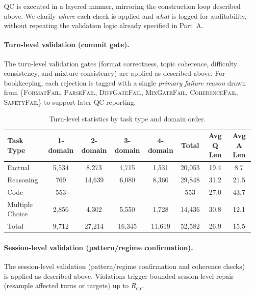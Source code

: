 QC is executed in a layered manner, mirroring the construction loop described above.
We clarify \emph{where} each check is applied and \emph{what} is logged for auditability, without repeating the validation logic already specified in Part~A.

\paragraph{Turn-level validation (commit gate).}
The turn-level validation gates (format correctness, topic coherence, difficulty consistency, and mixture consistency) are applied as described above.
For bookkeeping, each rejection is tagged with a single \emph{primary failure reason} drawn from \{\textsc{FormatFail}, \textsc{ParseFail}, \textsc{DiffGateFail}, \textsc{MixGateFail}, \textsc{CoherenceFail}, \textsc{SafetyFail}\} to support later QC reporting.

\begin{table}[t]
\caption{Turn-level statistics by task type and domain order.}
\vspace{-2mm}
\centering
\small
\begin{tabular}{lccccccc}
\toprule
\textbf{Task Type} & \textbf{1-domain} & \textbf{2-domain} & \textbf{3-domain} & \textbf{4-domain} & \textbf{Total} & \textbf{Avg Q Len} & \textbf{Avg A Len}\\
\midrule
Factual & 5,534 & 8,273 & 4,715 & 1,531 & 20,053 & 19.4 & 8.7\\
Reasoning & 769 & 14,639 & 6,080 & 8,360 & 29,848 & 31.2 & 21.5\\
Code & 553 & - & - & - & 553 & 27.0 & 43.7\\
Multiple Choice & 2,856 & 4,302 & 5,550 & 1,728 & 14,436 & 30.8 & 12.1\\
\midrule
Total & 9,712 & 27,214 & 16,345 & 11,619 & 52,582 & 26.9 & 15.5\\
\bottomrule
\end{tabular}
\vspace{-1mm}
\label{tab:turn_statistics}
\end{table}

\paragraph{Session-level validation (pattern/regime confirmation).}
The session-level validation (pattern/regime confirmation and coherence checks) is applied as described above.
Violations trigger bounded session-level repair (resample affected turns or targets) up to $R_{\mathrm{ep}}$.

